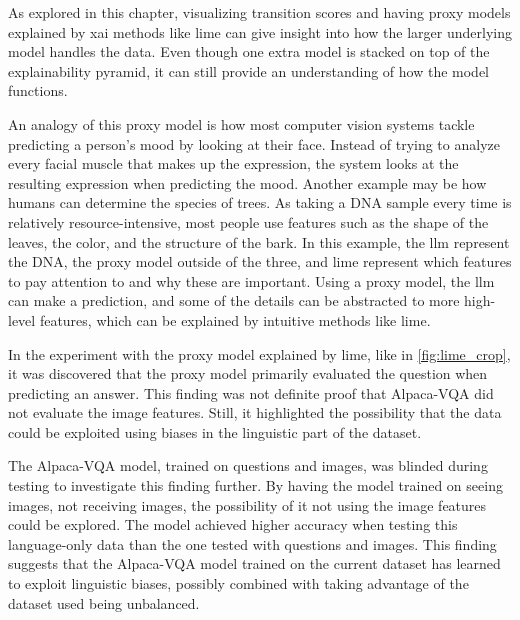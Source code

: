 As explored in this chapter, visualizing transition scores and having proxy models explained by \gls{xai} methods like \gls{lime} can give insight into how the larger underlying model handles the data. Even though one extra model is stacked on top of the explainability pyramid, it can still provide an understanding of how the model functions. 

An analogy of this proxy model is how most computer vision systems tackle predicting a person's mood by looking at their face. Instead of trying to analyze every facial muscle that makes up the expression, the system looks at the resulting expression when predicting the mood. 
Another example may be how humans can determine the species of trees. As taking a DNA sample every time is relatively resource-intensive, most people use features such as the shape of the leaves, the color, and the structure of the bark. In this example, the \gls{llm} represent the DNA, the proxy model outside of the three, and \gls{lime} represent which features to pay attention to and why these are important. 
Using a proxy model, the \gls{llm} can make a prediction, and some of the details can be abstracted to more high-level features, which can be explained by intuitive methods like \gls{lime}.

In the experiment with the proxy model explained by \gls{lime}, like in \autoref{fig:lime_crop}, it was discovered that the proxy model primarily evaluated the question when predicting an answer. 
This finding was not definite proof that Alpaca-VQA did not evaluate the image features. Still, it highlighted the possibility that the data could be exploited using biases in the linguistic part of the dataset. 

The Alpaca-VQA model, trained on questions and images, was blinded during testing to investigate this finding further. By having the model trained on seeing images, not receiving images, the possibility of it not using the image features could be explored. The model achieved higher accuracy when testing this language-only data than the one tested with questions and images.
This finding suggests that the Alpaca-VQA model trained on the current dataset has learned to exploit linguistic biases, possibly combined with taking advantage of the dataset used being unbalanced. 


